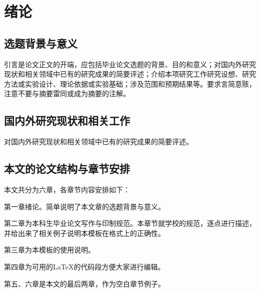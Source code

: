 
\chapter{绪论}
\label{cha:introduction}
\section{选题背景与意义}
\label{sec:background}
引言是论文正文的开端，应包括毕业论文选题的背景、目的和意义；对国内外研究现状和相关领域中已有的研究成果的简要评述；介绍本项研究工作研究设想、研究方法或实验设计、理论依据或实验基础；涉及范围和预期结果等。要求言简意赅，注意不要与摘要雷同或成为摘要的注解。

\section{国内外研究现状和相关工作}
\label{sec:related_work}
对国内外研究现状和相关领域中已有的研究成果的简要评述。
\section{本文的论文结构与章节安排}

\label{sec:arrangement}

本文共分为六章，各章节内容安排如下：

第一章绪论。简单说明了本文章的选题背景与意义。

第二章为本科生毕业论文写作与印制规范。本章节就学校的规范，逐点进行描述，并给出来了相关例子说明本模板在格式上的正确性。

第三章为本模板的使用说明。

第四章为可用的\LaTeX 的代码段方便大家进行编辑。

第五、六章是本文的最后两章，作为空白章节例子。

